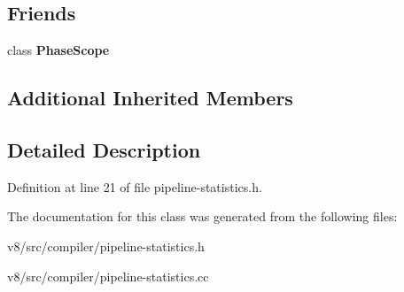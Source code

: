 \subsection*{Friends}
\begin{DoxyCompactItemize}
\item 
\mbox{\label{classv8_1_1internal_1_1compiler_1_1PipelineStatistics_a83107872a2da1a6ff69a6f49d40dabbe}} 
class {\bfseries Phase\+Scope}
\end{DoxyCompactItemize}
\subsection*{Additional Inherited Members}


\subsection{Detailed Description}


Definition at line 21 of file pipeline-\/statistics.\+h.



The documentation for this class was generated from the following files\+:\begin{DoxyCompactItemize}
\item 
v8/src/compiler/pipeline-\/statistics.\+h\item 
v8/src/compiler/pipeline-\/statistics.\+cc\end{DoxyCompactItemize}
